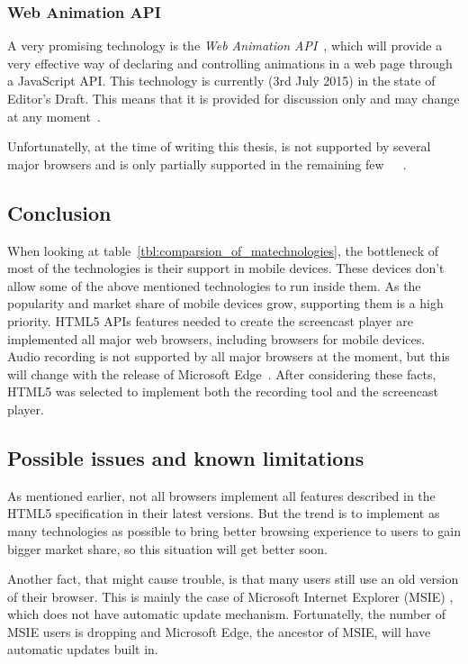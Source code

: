 \subsubsection*{Web Animation API}
A very promising technology is the \textit{Web Animation API}~\cite{web_animation_api}, which will provide a very effective way of declaring and controlling animations in a web page through a JavaScript API. This technology is currently (3rd July 2015) in the state of Editor's Draft. This means that it is provided for discussion only and may change at any moment~\cite{web_animations_draft}.

Unfortunatelly, at the time of writing this thesis, is not supported by several major browsers and is only partially supported in the remaining few~\cite{ms_no_anim}~\cite{anim_api_partial}~\cite{anim_api_partial2}.

\subsection{Conclusion}
When looking at table~\ref{tbl:comparsion_of_matechnologies}, the bottleneck of most of the technologies is their support in mobile devices. These devices don't allow some of the above mentioned technologies to run inside them. As the popularity and market share of mobile devices grow, supporting them is a high priority. HTML5 APIs features needed to create the screencast player are implemented all major web browsers, including browsers for mobile devices. Audio recording is not supported by all major browsers at the moment, but this will change with the release of Microsoft Edge~\cite{edge_getusermedia}. After considering these facts, HTML5 was selected to implement both the recording tool and the screencast player.

\subsection{Possible issues and known limitations}
As mentioned earlier, not all browsers implement all features described in the HTML5 specification in their latest versions. But the trend is to implement as many technologies as possible to bring better browsing experience to users to gain bigger market share, so this situation will get better soon.

Another fact, that might cause trouble, is that many users still use an old version of their browser. This is mainly the case of Microsoft Internet Explorer (MSIE) , which does not have automatic update mechanism. Fortunatelly, the number of MSIE users is dropping and Microsoft Edge, the ancestor of MSIE, will have automatic updates built in.

